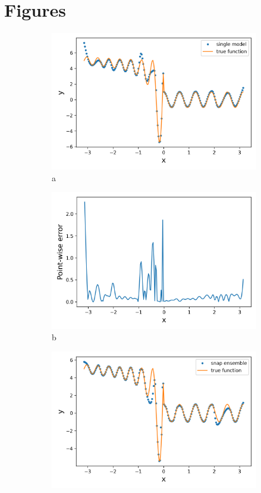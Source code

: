 \section{Figures}
\begin{figure}[htbp]
	\centering
	\begin{subfigure}{.45\textwidth}
		\centering
		\includegraphics[width=1\linewidth]{./figs/sm_rep_fun.png}  
		\caption{a}
	\end{subfigure}
	\begin{subfigure}{.45\textwidth}
		\centering
		\includegraphics[width=1\linewidth]{./figs/sm_rep_err.png}  
		\caption{b}
	\end{subfigure}
	\begin{subfigure}{.45\textwidth}
		\centering
		\includegraphics[width=1\linewidth]{./figs/snap_rep_fun.png}  

\end{subfigure}
\end{figure}
